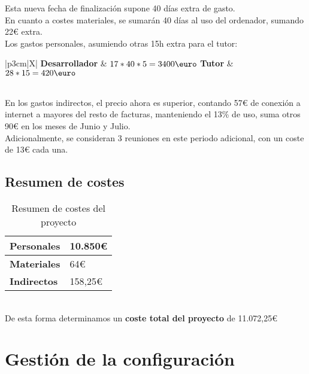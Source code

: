 Esta nueva fecha de finalización supone 40 días extra de gasto. \\

En cuanto a costes materiales, se sumarán 40 días al uso del ordenador, sumando 22{\euro} extra.\\

Los gastos personales, asumiendo otras 15h extra para el tutor:\\

\begin{table} [H]
    \begin{tabularx}{\linewidth}{|p{3cm}|X|}
        \hline
        \textbf{Desarrollador} & $17*40*5=3400\mbox{\euro}$ \tabularnewline
        \hline
        \textbf{Tutor} & $28*15=420\mbox{\euro}$ \tabularnewline
        \hline
    \end{tabularx}
    \caption{Costes personales del proyecto}
    \label{tab:costes-personales}
\end{table}
\ \\
En los gastos indirectos, el precio ahora es superior, contando 57{\euro} de conexión a internet a mayores del resto de facturas, manteniendo el 13\% de uso, suma otros 90{\euro} en los meses de Junio y Julio.\\

Adicionalmente, se consideran 3 reuniones en este periodo adicional, con un coste de 13{\euro} cada una.

\subsection{Resumen de costes}

\begin{table} [h]
    \begin{tabularx}{\linewidth}{|p{3cm}|X|}
        \hline
        \textbf{Personales} & 10.850{\euro} \tabularnewline
        \hline
        \textbf{Materiales} & 64{\euro} \tabularnewline
        \hline
        \textbf{Indirectos} & 158,25{\euro} \tabularnewline
        \hline
    \end{tabularx}
    \caption{Resumen de costes del proyecto}
    \label{tab:costes-resumen}
\end{table}
    \ \\
De esta forma determinamos un \textbf{coste total del proyecto} de 11.072,25{\euro}

\section{Gestión de la configuración}

